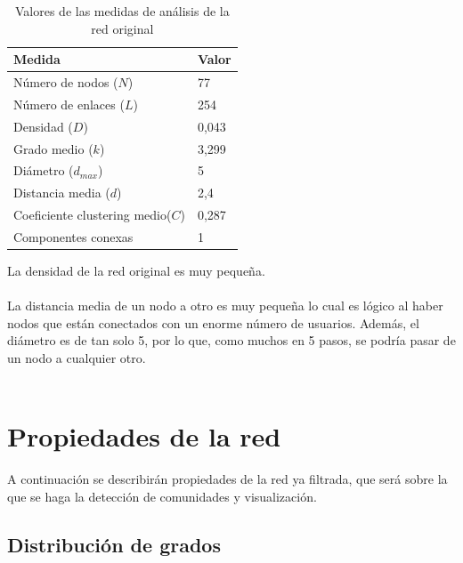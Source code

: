 \begin{table}[H]
	\centering
	\caption{Valores de las medidas de análisis de la red original}
	\label{tab:medidas-original}
	\begin{tabular}{| l | l |}
		\hline
		Medida                							& Valor          \\ 
		\hline
		Número de nodos ($N$)           					& 77           \\
		Número de enlaces ($L$)                   		& 254           \\
		Densidad ($D$)                   				& 0,043         \\
		Grado medio ($k$)                   				& 3,299          \\
		Diámetro ($d_{max}$)             				& 5              \\
		Distancia media ($d$)                   			& 2,4          \\
		Coeficiente clustering medio($C$)              	& 0,287          \\
		Componentes conexas   							& 1            \\ 
		\hline
	\end{tabular}
\end{table}

La densidad de la red original es muy pequeña.
\\ \\
La distancia media de un nodo a otro es muy pequeña lo cual es lógico al haber nodos que están conectados con un enorme número de usuarios. Además, el diámetro es de tan solo 5, por lo que, como muchos en 5 pasos, se podría pasar de un nodo a cualquier otro.
\\ \\

\section{Propiedades de la red}

A continuación se describirán propiedades de la red ya filtrada, que será sobre la que se haga la detección de comunidades y visualización.

\subsection{Distribución de grados}

